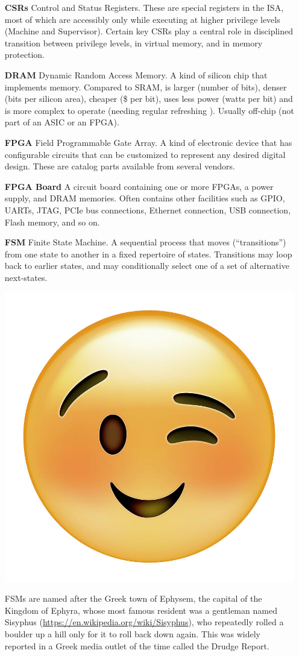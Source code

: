 \begin{itemize}
\item[\bf CSRs] Control and Status Registers.  These are special
  registers in the ISA, most of which are accessibly only while
  executing at higher privilege levels (Machine and Supervisor).
  Certain key CSRs play a central role in disciplined transition
  between privilege levels, in virtual memory, and in memory
  protection.

\item[\bf DRAM] Dynamic Random Access Memory.  A kind of silicon chip
  that implements memory.  Compared to SRAM, is larger (number of
  bits), denser (bits per silicon area), cheaper (\$ per bit), uses
  less power (watts per bit) and is more complex to operate (needing
  regular refreshing {\etc}). Usually off-chip (not part of an ASIC or
  an FPGA).

\item[\bf FPGA] Field Programmable Gate Array.  A kind of electronic
  device that has configurable circuits that can be customized to
  represent any desired digital design.  These are catalog parts
  available from several vendors.

\item[\bf FPGA Board] A circuit board containing one or more FPGAs, a
  power supply, and DRAM memories.  Often contains other facilities
  such as GPIO, UARTs, JTAG, PCIe bus connections, Ethernet
  connection, USB connection, Flash memory, and so on.

\item[\bf FSM] Finite State Machine.  A sequential process that moves
  (``transitions'') from one state to another in a fixed repertoire of
  states.  Transitions may loop back to earlier states, and may
  conditionally select one of a set of alternative next-states.

  \includegraphics[height=5ex]{Figures/emoji-wink-small-smile-ali-lynne-2763030347.jpeg}
  \hmm
  \begin{minipage}{5in}
  FSMs are named after the Greek town of Ephysem, the capital of the
  Kingdom of Ephyra, whose most famous resident was a gentleman named
  Sisyphus (\url{https://en.wikipedia.org/wiki/Sisyphus}), who
  repeatedly rolled a boulder up a hill only for it to roll back down
  again.  This was widely reported in a Greek media outlet of the time
  called the Drudge Report.
  \end{minipage}


\end{itemize}

